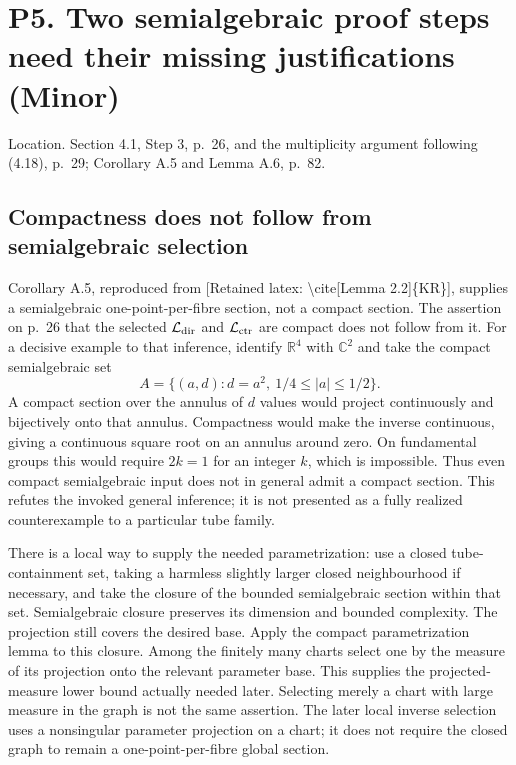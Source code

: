 \documentclass[10pt]{article}
\begin{document}
\section*{P5. Two semialgebraic proof steps need their missing justifications (Minor)}
Location. Section 4.1, Step 3, p. 26, and the multiplicity argument following (4.18), p. 29; Corollary A.5 and Lemma A.6, p. 82.\par
\subsection*{Compactness does not follow from semialgebraic selection}
Corollary A.5, reproduced from [Retained latex: \textbackslash{}cite[Lemma 2.2]\{KR\}], supplies a semialgebraic one-point-per-fibre section, not a compact section. The assertion on p. 26 that the selected \(\mathcal L_{\rm dir}\) and \(\mathcal L_{\rm ctr}\) are compact does not follow from it. For a decisive example to that inference, identify \(\mathbb R^4\) with \(\mathbb C^2\) and take the compact semialgebraic set \[A=\{(a,d):d=a^2,\ 1/4\leq |a|\leq1/2\}.\] A compact section over the annulus of \(d\) values would project continuously and bijectively onto that annulus. Compactness would make the inverse continuous, giving a continuous square root on an annulus around zero. On fundamental groups this would require \(2k=1\) for an integer \(k\), which is impossible. Thus even compact semialgebraic input does not in general admit a compact section. This refutes the invoked general inference; it is not presented as a fully realized counterexample to a particular tube family.\par
There is a local way to supply the needed parametrization: use a closed tube-containment set, taking a harmless slightly larger closed neighbourhood if necessary, and take the closure of the bounded semialgebraic section within that set. Semialgebraic closure preserves its dimension and bounded complexity. The projection still covers the desired base. Apply the compact parametrization lemma to this closure. Among the finitely many charts select one by the measure of its projection onto the relevant parameter base. This supplies the projected-measure lower bound actually needed later. Selecting merely a chart with large measure in the graph is not the same assertion. The later local inverse selection uses a nonsingular parameter projection on a chart; it does not require the closed graph to remain a one-point-per-fibre global section.\par
\end{document}
